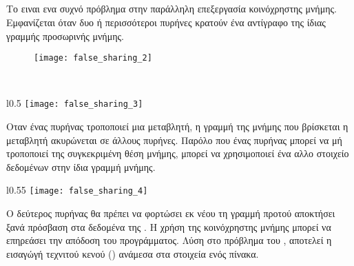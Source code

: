 \paragraph{}
\subparagraph{}
Το  ειναι ενα συχνό πρόβλημα στην παράλληλη επεξεργασία κοινόχρηστης μνήμης. Εμφανίζεται όταν δυο ή περισσότεροι πυρήνες κρατούν ένα αντίγραφο της ίδιας γραμμής προσωρινής μνήμης. 

\begin{figure}[h]
\texttt{[image: false\_sharing\_2]}
\centering
\captionsetup{justification=centering, singlelinecheck=false}
	\caption{}
\label{fig:false_sharing_2}
\end{figure}

\ \\
\begin{wrapfigure}{l}{0.5\textwidth}
	\centering
	\texttt{[image: false\_sharing\_3]}
	\captionsetup{justification=centering, singlelinecheck=false}
	\caption{}
\label{fig:false_sharing_3}
\end{wrapfigure}

Οταν ένας πυρήνας τροποποιεί μια μεταβλητή, η γραμμή της μνήμης που βρίσκεται η μεταβλητή ακυρώνεται σε άλλους πυρήνες. Παρόλο που ένας πυρήνας μπορεί να μή τροποποιεί της συγκεκριμένη θέση μνήμης, μπορεί να χρησιμοποιεί ένα αλλο στοιχείο δεδομένων στην ίδια γραμμή μνήμης. 
\clearpage
\begin{wrapfigure}{l}{0.55\textwidth}
	\centering
	\texttt{[image: false\_sharing\_4]}
	\captionsetup{justification=centering, singlelinecheck=false}
	\caption{}
\label{fig:false_sharing_4}
\end{wrapfigure}
Ο δεύτερος πυρήνας θα πρέπει να φορτώσει εκ νέου τη γραμμή προτού αποκτήσει ξανά πρόσβαση στα δεδομένα της . Η χρήση της κοινόχρηστης μνήμης μπορεί να επηρεάσει την απόδοση του προγράμματος\cite{false_sharing}.
Λύση στο πρόβλημα του , αποτελεί η εισαγώγή τεχνιτού κενού () ανάμεσα στα στοιχεία ενός πίνακα.
\ \\
